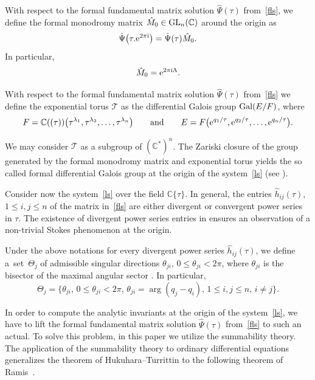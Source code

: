 \documentclass[pdftex]{sigma}
\numberwithin{equation}{section}
\begin{document}
 \begin{Definition}%
 {With respect to the formal fundamental matrix solution $\hat{\Psi}(\tau)$ from~\eqref{fls}, we define the formal
 monodromy matrix $\hat{M}_0\in{\rm GL}_n(\mathbb{C})$ around the origin as
 \[
 \hat{\Psi}\bigl(\tau. {\rm e}^{2 \pi  {\rm i}}\bigr)=\hat{\Psi}(\tau) \hat{M}_0 .
 \]
 In particular,
 \[
 \hat{M}_0={\rm e}^{2 \pi {\rm i} \Lambda} .
 \]}
 \end{Definition}

 \begin{Definition}%
 With respect to the formal fundamental matrix solution $\hat{\Psi}(\tau)$ from~\eqref{fls} we define the exponential
 torus $\mathcal{T}$ as the differential Galois group ${\rm Gal}(E/F)$, where
 \[
 F=\mathbb{C}((\tau))\bigl(\tau^{\lambda_1}, \tau^{\lambda_2}, \dots, \tau^{\lambda_n}\bigr) \qquad \text{and} \qquad
 E=F\bigl({\rm e}^{q_1/\tau}, {\rm e}^{q_2/\tau}, \dots, {\rm e}^{q_n/\tau}\bigr).
 \]
 \end{Definition}
 We may consider $\mathcal{T}$ as a subgroup of $(\mathbb{C}^*)^n$. The Zariski closure of the group
 generated by the formal monodromy matrix and exponential torus yields the so called formal differential Galois group
 at the origin of the system~\eqref{ls} (see \cite{Si, vPS}).

 Consider now the system~\eqref{ls} over the field $\mathbb{C}\{\tau\}$. In general, the entries $\hat{h}_{ij}(\tau)$, $1 \leq i, j \leq n$
 of the matrix  in~\eqref{fls} are either divergent or convergent power series in $\tau$.
 The existence of divergent power series entries in  ensures an observation of a non-trivial Stokes
 phenomenon at the origin.

 \begin{Definition}\label{st}
 Under the above notations for every divergent power series $\hat{h}_{i j}(\tau)$, we define a~set~$\Theta_j$
 	of admissible singular directions $\theta_{ji}$, $0 \leq \theta_{ji} < 2 \pi$, where $\theta_{ji}$ is the
 	bisector of the maximal angular sector . In
 	particular,
 	 \[
 	 \Theta_j=\{ \theta_{ji},\, 0 \leq \theta_{ji} < 2 \pi,\, \theta_{ji}= \arg (q_j-q_i),\,
 	 1 \leq i, j  \leq n,\, i \neq j \} .
 	 \]
 \end{Definition}
 In order to compute the analytic invariants at the origin of the system~\eqref{ls}, we have to lift the formal
 fundamental matrix solution $\hat{\Psi}(\tau)$ from~\eqref{fls} to such an actual. To solve this problem,
 in this paper we utilize the summability theory. The application of the summability theory to ordinary
 differential equations generalizes the theorem of Hukuhara--Turrittin to the following theorem of Ramis~\cite{R2}.
\end{document}
